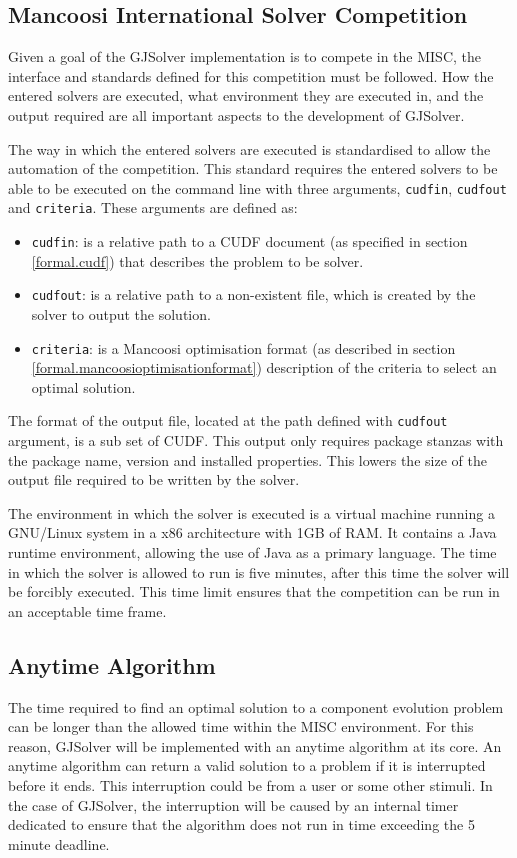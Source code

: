 \subsection{Mancoosi International Solver Competition}
\label{impl.MISCDEF}
Given a goal of the GJSolver implementation is to compete in the MISC, the interface and standards defined for this competition must be followed.
How the entered solvers are executed, what environment they are executed in, and the output required are all important aspects to the development of GJSolver.

The way in which the entered solvers are executed is standardised to allow the automation of the competition.
This standard requires the entered solvers to be able to be executed on the command line with three arguments, \verb+cudfin+, \verb+cudfout+ and \verb+criteria+.
These arguments are defined as:
\begin{itemize}
  \item \verb+cudfin+: is a relative path to a CUDF document (as specified in section \ref{formal.cudf}) that describes the problem to be solver.
  \item \verb+cudfout+: is a relative path to a non-existent file, which is created by the solver to output the solution.
  \item \verb+criteria+: is a Mancoosi optimisation format (as described in section \ref{formal.mancoosioptimisationformat}) description of the criteria to select an optimal solution. 
\end{itemize}
The format of the output file, located at the path defined with \verb+cudfout+ argument, is a sub set of CUDF.
This output only requires package stanzas with the package name, version and installed properties.
This lowers the size of the output file required to be written by the solver.

The environment in which the solver is executed is a virtual machine running a GNU/Linux system in a x86 architecture with 1GB of RAM.
It contains a Java runtime environment, allowing the use of Java as a primary language.
The time in which the solver is allowed to run is five minutes, after this time the solver will be forcibly executed.
This time limit ensures that the competition can be run in an acceptable time frame.

\subsection{Anytime Algorithm}
The time required to find an optimal solution to a component evolution problem can be longer than the allowed time within the MISC environment.
For this reason, GJSolver will be implemented with an anytime algorithm at its core.
An anytime algorithm can return a valid solution to a problem if it is interrupted before it ends.
This interruption could be from a user or some other stimuli.
In the case of GJSolver, the interruption will be caused by an internal timer dedicated to ensure that the algorithm does not run in time exceeding the 5 minute deadline.

